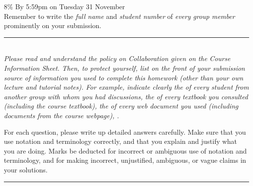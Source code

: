 \documentclass[11pt,twoside]{article}
\begin{document}
\noindent
{}  8\%
\hfill
{}  By 5:59pm on Tuesday 31 November\\[2ex]
\strong
   {Remember to write
    the \emph{full name} and \emph{student number}
    of \emph{every group member}
    prominently on your submission.}

\medskip

\noindent
\rule{\textwidth}{.5pt}\\[1ex]
\begingroup\slshape
    Please read and understand the policy on Collaboration
    given on the Course Information Sheet.
    Then, to protect yourself,
    list on the front of your submission
     source of information
    you used to complete this homework
    (other than your own lecture and tutorial notes).
    For example, indicate clearly
    the  of every student from another group
    with whom you had discussions,
    the  of every textbook you consulted
    (including the course textbook),
    the  of every web document you used
    (including documents from the course webpage),
    \etc.\par
        For each question, please write up detailed answers carefully.
    Make sure that you use notation and terminology correctly, and
    that you explain and justify what you are doing.
    Marks  be deducted
    for incorrect or ambiguous use of notation and terminology, and
    for making incorrect, unjustified, ambiguous, or vague claims
    in your solutions.
\endgroup\\
\rule{\textwidth}{.5pt}
\end{document}
